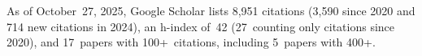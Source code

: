 %
As of October~27, 2025, Google Scholar lists
8,951 citations (3,590 since 2020 and 714 new citations in 2024),
an h-index of~42 (27~counting only citations since 2020),
and 17~papers with 100+~citations, including 5~papers with 400+.
